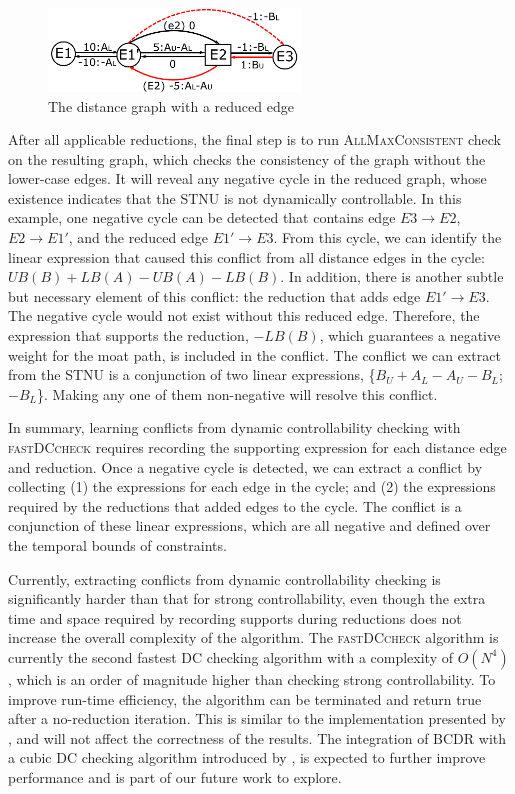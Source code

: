 \documentclass[jair,twoside,11pt,theapa]{article}
\begin{document}
\begin{figure}[htb]
	\centering
	\includegraphics[width=0.6\textwidth]{figures/DC_reductions/dc_reduction4.pdf}
	\caption{The distance graph with a reduced edge}
	\label{fig:dc_reduction4}
\end{figure}


After all applicable reductions, the final step is to run
\textsc{AllMaxConsistent} check on the resulting graph, which checks the
consistency of the graph without the lower-case edges. It will
reveal any negative cycle in the reduced graph, whose existence indicates that
the STNU is not dynamically controllable. In this example, one negative cycle
can be detected that contains edge $E3\rightarrow E2$, $E2\rightarrow E1'$, and
the reduced edge $E1'\rightarrow E3$. From this cycle, we can identify the
linear expression that caused this conflict from all distance edges in the
cycle: $UB(B)+LB(A)-UB(A)-LB(B)$. In addition, there is another subtle but
necessary element of this conflict: the reduction that adds edge $E1'\rightarrow
E3$. The negative cycle would not exist without this reduced edge. Therefore,
the expression that supports the reduction, $-LB(B)$, which guarantees a
negative weight for the moat path, is included in the conflict. The conflict we
can extract from the STNU is a conjunction of two linear expressions,
\{$B_U+A_L-A_U-B_L$;$-B_L$\}. Making any one of them non-negative will
resolve this conflict.


In summary, learning conflicts from dynamic controllability checking with
\textsc{fastDCcheck} requires recording the supporting expression for each
distance edge and reduction. Once a negative cycle is detected, we can extract a
conflict by collecting (1) the expressions for each edge in the cycle; and (2)
the expressions required by the reductions that added edges to the cycle. The
conflict is a conjunction of these linear expressions, which are all negative
and defined over the temporal bounds of constraints. 


Currently, extracting conflicts from dynamic controllability checking is
significantly harder than that for strong controllability, even though the extra
time and space required by recording supports during reductions does not
increase the overall complexity of the algorithm. The \textsc{fastDCcheck}
algorithm is currently the second fastest DC checking algorithm with a
complexity of $O(N^4)$, which is an order of magnitude higher than checking
strong controllability. To improve run-time efficiency, the algorithm can be
terminated and return true after a no-reduction iteration. This is similar to
the implementation presented by , and will not affect the
correctness of the results. The integration of BCDR with a cubic DC checking
algorithm introduced by , is expected to further improve
performance and is part of our future work to explore.
\end{document}
